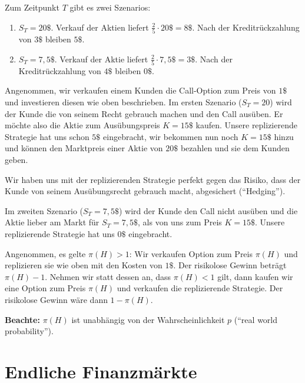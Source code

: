\documentclass[a4paper,twoside,DIV15,BCOR12mm]{scrbook}
\begin{document}
\begin{beispiel}
Zum Zeitpunkt $T$ gibt es zwei Szenarios:
\begin{enumerate}
\item $S_T=20\$$. Verkauf der Aktien liefert $\frac 25 \cdot 20\$ = 8\$$. Nach der Kreditrückzahlung von $3\$$ bleiben $5\$$.
\item $S_T=7,5\$$. Verkauf der Aktie liefert $\frac 25 \cdot 7,5\$ = 3\$$. Nach der Kreditrückzahlung von $4\$$ bleiben $0\$$.
\end{enumerate}

Angenommen, wir verkaufen einem Kunden die Call-Option zum Preis von $1\$$ und investieren diesen wie oben beschrieben. Im ersten Szenario ($S_T=20$) wird der Kunde die von seinem Recht gebrauch machen und den Call ausüben. Er möchte also die Aktie zum Ausübungspreis $K=15\$$ kaufen. Unsere replizierende Strategie hat uns schon $5\$$ eingebracht, wir bekommen nun noch $K=15\$$ hinzu und können den Marktpreis einer Aktie von $20\$$ bezahlen und sie dem Kunden geben.

Wir haben uns mit der replizierenden Strategie perfekt gegen das Risiko, dass der Kunde  von seinem Ausübungsrecht gebrauch macht, abgesichert (“Hedging”).

Im zweiten Szenario ($S_T=7,5\$$) wird der Kunde den Call nicht ausüben und die Aktie lieber am Markt für $S_T=7,5\$$, als von uns zum Preis $K=15\$$. Unsere replizierende Strategie hat uns $0\$$ eingebracht.

Angenommen, es gelte $\pi(H)>1$: Wir verkaufen Option zum Preis $\pi(H)$ und replizieren sie wie oben mit den Kosten von $1\$$. Der risikolose Gewinn beträgt $\pi(H) - 1$. Nehmen wir statt dessen an, dass $\pi(H)<1$ gilt, dann kaufen wir eine Option zum Preis $\pi(H)$ und verkaufen die replizierende Strategie. Der risikolose Gewinn wäre dann $1-\pi(H)$.

\textbf{Beachte:} $\pi(H)$ ist unabhängig von der Wahrscheinlichkeit $p$ (“real world probability”).
\end{beispiel}

\section{Endliche Finanzmärkte}
\end{document}
